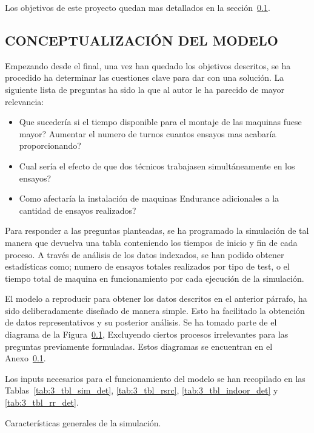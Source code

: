 Los objetivos de este proyecto quedan mas detallados en la sección~\ref{}.

\subsection{CONCEPTUALIZACIÓN DEL MODELO}

Empezando desde el final, una vez han quedado los objetivos descritos, se ha procedido ha determinar las cuestiones clave para dar con una solución. La siguiente lista de preguntas ha sido la que al autor le ha parecido de mayor relevancia:

\begin{itemize}
	\item Que sucedería si el tiempo disponible para el montaje de las maquinas fuese mayor? Aumentar el numero de turnos cuantos ensayos mas acabaría proporcionando?
	\item Cual sería el efecto de que dos técnicos trabajasen simultáneamente en los ensayos?
	\item Como afectaría la instalación de maquinas Endurance adicionales a la cantidad de ensayos realizados?
\end{itemize}

Para responder a las preguntas planteadas,
se ha programado la simulación de tal manera que devuelva una tabla
conteniendo los tiempos de inicio y fin de cada proceso.
A través de análisis de los datos indexados,
se han podido obtener estadísticas como;
numero de ensayos totales realizados por tipo de test,
o el tiempo total de maquina en funcionamiento
por cada ejecución de la simulación.

El modelo a reproducir para obtener los datos descritos	en el anterior párrafo,
ha sido deliberadamente diseñado de manera simple.
Esto ha facilitado la obtención de datos representativos y su posterior análisis.
Se ha tomado parte de el diagrama de la Figura~\ref{},
Excluyendo ciertos procesos irrelevantes
para las preguntas previamente formuladas.
Estos diagramas se encuentran en el Anexo~\ref{}.

Los inputs necesarios para el funcionamiento del modelo
se han recopilado en las Tablas~\ref{tab:3_tbl_sim_det},
\ref{tab:3_tbl_rsrc},
\ref{tab:3_tbl_indoor_det}
y \ref{tab:3_tbl_rr_det}.

\begin{table}
	\centering
	\caption{Características generales de la simulación.}
	
	\label{tab:3_tbl_sim_det}
\end{table}

